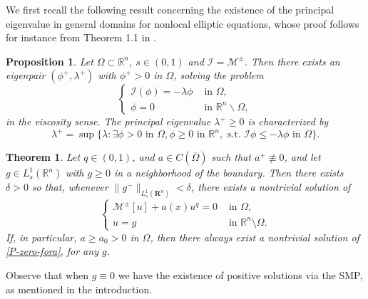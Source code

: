 \documentclass[11pt]{article}
\newtheorem{theorem}{Theorem}
\newtheorem{proposition}{Proposition}
\begin{document}
We first recall the following result concerning the existence of the principal eigenvalue in general domains for  nonlocal elliptic equations, whose proof follows for instance from Theorem 1.1 in \cite{davila2023harnack}.


\begin{proposition}\label{Erwin}
    Let \(\Omega\subset\mathbb{R}^{n}\), \(s\in(0,1)\) and \(\mathcal{I}=\mathcal{M}^{\pm}\). Then there exists an eigenpair \((\phi^{+},\lambda^{+})\) with \(\phi^{+}>0\) in \(\Omega\), solving the problem 
    \begin{equation*}
    \begin{cases}
    \mathcal{I}(\phi)  = -\lambda\phi & \text{ in } \Omega, \\ 
    \phi = 0 & \text{ in }\mathbb{R}^{n}\backslash\Omega,
    \end{cases}
    \end{equation*}
    in the viscosity sense. The principal eigenvalue \(\lambda^{+}\geq 0\) is characterized by
    \begin{equation*}
        \lambda^{+} = \sup\{\lambda:\exists\phi>0\text{ in }\Omega, \phi\geq0\text{ in }\mathbb{R}^{n},\text{ s.t. }\mathcal{I}\phi  \leq -\lambda\phi\text{ in }\Omega\}.
    \end{equation*}
\end{proposition}

\begin{theorem}\label{TheoremExistence}
Let $q\in (0,1)$, and \(a\in C(\overline{\Omega})\) such that $a^+\not\equiv 0$, and let $g\in L^{1}_{s}(\mathbb{R}^n)$ with $g\ge 0$ in a neighborhood of the boundary.  
Then there exists $\delta>0$ so that, whenever $\|g^{-}\|_{L^{1}_{s}(\mathbf{R}^n)}< \delta $, there exists a nontrivial solution of 
\begin{equation}\label{P-zero-fora}
    \begin{cases}
        \mathcal{M}^{\pm}[u]+a(x)u^{q} = 0 & \text{ in } \Omega, \\
        u=g & \text{ in } \mathbb{R}^{n}\setminus\Omega.
    \end{cases}
\end{equation} 
If, in particular, $a\ge a_0 >0$ in $\Omega$, then there always exist a nontrivial solution of \eqref{P-zero-fora}, for any $g$.
\end{theorem}
Observe that when $g\equiv 0$ we have the existence of positive solutions via the SMP, as mentioned in the introduction.
\end{document}
